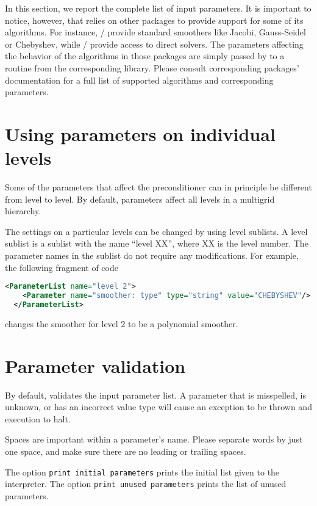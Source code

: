 \label{sec:muelu_options}

In this section, we report the complete list of \muelu{} input parameters.  It
is important to notice, however, that \muelu{} relies on other \trilinos{}
packages to provide support for some of its algorithms. For instance,
\ifpack{}/\ifpacktwo{} provide standard smoothers like Jacobi, Gauss-Seidel or
Chebyshev, while \amesos{}/\amesostwo{} provide access to direct solvers. The
parameters affecting the behavior of the algorithms in those packages are
simply passed by \muelu{} to a routine from the corresponding library. Please
consult corresponding packages' documentation for a full list of supported
algorithms and corresponding parameters.

\section{Using parameters on individual levels}
Some of the parameters that affect the preconditioner can in principle be
different from level to level. By default, parameters affect all levels in
a multigrid hierarchy.

The settings on a particular levels can be changed by using level sublists.
A level sublist is a \parameterlist{} sublist with the name ``level XX'', where XX is the level number. The
parameter names in the sublist do not require any modifications. For example,
the following fragment of code
\begin{lstlisting}[language=XML]
  <ParameterList name="level 2">
    <Parameter name="smoother: type" type="string" value="CHEBYSHEV"/>
  </ParameterList>
\end{lstlisting}
changes the smoother for level 2 to be a polynomial smoother.

\section{Parameter validation}
By default, \muelu{} validates the input parameter list. A parameter that is
misspelled, is unknown, or has an incorrect value type will cause an exception to be
thrown and execution to halt.

\begin{mycomment}
Spaces are important within a parameter's name. Please separate words
by just one space, and make sure there are no leading or trailing spaces.
\end{mycomment}

The option \verb|print initial parameters| prints the initial list given to the
interpreter. The option \verb|print unused parameters| prints the list of unused
parameters.

